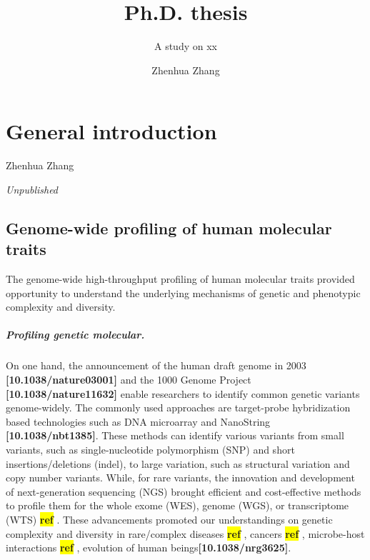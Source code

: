 \documentclass[12pt,usletter, fancy]{elegantbook}
\title{Ph.D. thesis}
\subtitle{A study on xx}
\author{Zhenhua Zhang}
\institute{University Medical Center Groningen}
\def\blankpage{%
  \clearpage%
  \thispagestyle{empty}%
  \addtocounter{page}{-1}%
  \null%
\clearpage}
\newcommand{\reqref}[1][ref]{
  \colorbox{yellow}{\textbf{#1}}
}
\begin{document}
\maketitle
\frontmatter

\mainmatter


\chapter{General introduction}
Zhenhua Zhang

\textit{Unpublished}

\newpage
\section*{Genome-wide profiling of human molecular traits}
The genome-wide high-throughput profiling of human molecular traits provided opportunity to understand the underlying mechanisms of genetic and phenotypic complexity and diversity.

\paragraph*{Profiling genetic molecular.}
On one hand, the announcement of the human draft genome in 2003 \textbf{[10.1038/nature03001]} and the 1000 Genome Project \textbf{[10.1038/nature11632]} enable researchers to identify common genetic variants genome-widely.
The commonly used approaches are target-probe hybridization based technologies such as DNA microarray and NanoString \textbf{[10.1038/nbt1385]}.
These methods can identify various variants from small variants, such as single-nucleotide polymorphism (SNP) and short insertions/deletions (indel), to large variation, such as structural variation and copy number variants.
While, for rare variants, the innovation and development of next-generation sequencing (NGS) brought efficient and cost-effective methods to profile them for the whole exome (WES), genome (WGS), or transcriptome (WTS)\reqref.
These advancements promoted our understandings on genetic complexity and diversity in rare/complex diseases\reqref, cancers\reqref, microbe-host interactions\reqref, evolution of human beings\textbf{[10.1038/nrg3625]}.
\end{document}
